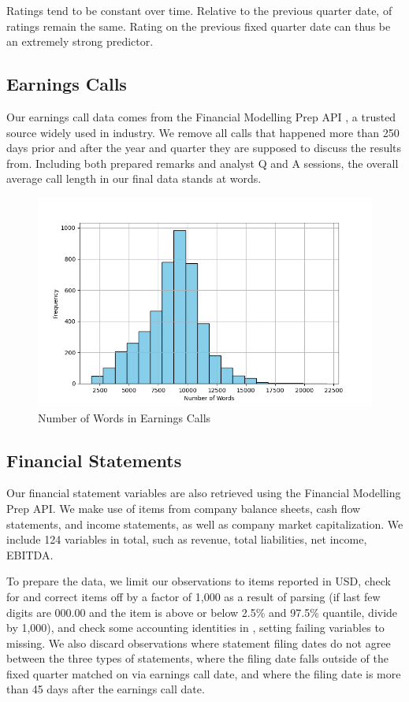 \documentclass{article}[11pt]
\begin{document}
    Ratings tend to be constant over time. Relative to the previous quarter date, \shareNotChanges \space of ratings remain the same. Rating on the previous fixed quarter date can thus be an extremely strong predictor.

    \subsection*{Earnings Calls}

    Our earnings call data comes from the Financial Modelling Prep API \citep{financial_modeling_prep_financial_2024}, a trusted source widely used in industry. We remove all calls that happened more than 250 days prior and after the year and quarter they are supposed to discuss the results from. Including both prepared remarks and analyst Q and A sessions, the overall average call length in our final data stands at \avgCallLength \space words.

    \begin{figure}[h!]
		\centering
        \caption{Number of Words in Earnings Calls}
        \includegraphics[width=0.5\linewidth,keepaspectratio=true]{../Output/All Data EDA/NLP EDA/all_data_num_words_distribution_no_title.png}
	\end{figure}

    \subsection*{Financial Statements}

    Our financial statement variables are also retrieved using the Financial Modelling Prep API. We make use of items from company balance sheets, cash flow statements, and income statements, as well as company market capitalization. We include 124 variables in total, such as revenue, total liabilities, net income, EBITDA.
    
    To prepare the data, we limit our observations to items reported in USD, check for and correct items off by a factor of 1,000 as a result of parsing (if last few digits are 000.00 and the item is above or below 2.5\% and 97.5\% quantile, divide by 1,000), and check some accounting identities in \cite{das_credit_2023}, setting failing variables to missing. We also discard observations where statement filing dates do not agree between the three types of statements, where the filing date falls outside of the fixed quarter matched on via earnings call date, and where the filing date is more than 45 days after the earnings call date.
\end{document}
